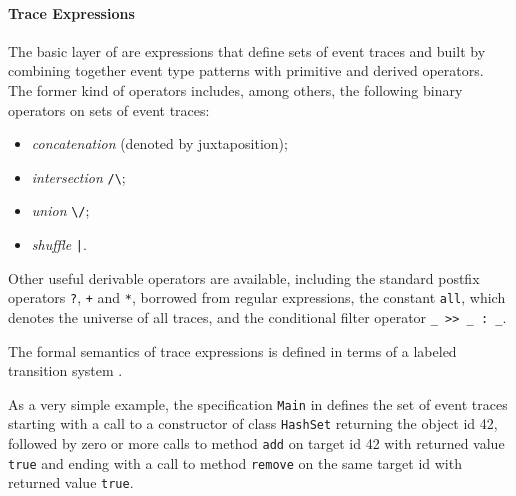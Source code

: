 \paragraph{Trace Expressions}
The basic layer of \rml are expressions that define sets of event traces and built by combining together event type patterns with primitive and derived operators.
The former kind of operators includes, among others, the following binary operators on sets of event traces:
\begin{itemize}
	\item \emph{concatenation} (denoted by juxtaposition);
	\item \emph{intersection} \lstinline{/\};
	\item \emph{union} \lstinline{\/}; 
	\item \emph{shuffle} \lstinline{|}. 
\end{itemize}
Other useful derivable operators are available, including the standard postfix operators
\lstinline{?}, \lstinline{+} and \lstinline{*}, borrowed from regular expressions,  the constant \lstinline{all}, which denotes the universe of all traces,
and the  conditional filter operator \lstinline{_ >> _ : _}.

The formal semantics of trace expressions is defined in terms of a labeled transition system \cite{RML2021}.

As a very simple example, the specification \lstinline{Main} in  defines the set of event traces starting with a call to
a constructor of class \lstinline{HashSet} returning the object id 42, followed by zero or more calls to method \lstinline{add} on target id 42 with returned value \lstinline{true} and ending with a call to method \lstinline{remove} on the same target id with returned value \lstinline{true}.


